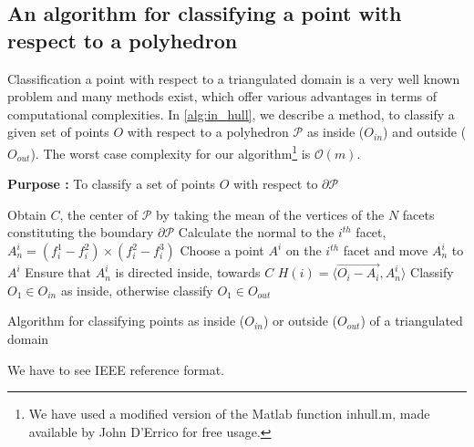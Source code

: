 \documentclass[12pt,a4]{article}
\begin{document}
\subsection{An algorithm for classifying a point with respect to a polyhedron}\label{app:polyhedron_point}
\indent Classification a point with respect to a triangulated domain is a very well known problem and many methods exist, which offer various advantages in terms of computational complexities. In \cref{alg:in_hull}, we describe a method, to classify a given set of points $O$ with respect to a polyhedron $\mathcal{P}$ as inside ($O_{in}$) and outside ($O_{out}$). The worst case complexity for our algorithm\footnote{We have used a modified version of the Matlab function inhull.m, made available by John D'Errico for free usage. } is $\mathcal{O}(m)$.    
\begin{algorithm}[ht!]
	\textbf{Purpose :} To classify a set of points $ O $ with respect to $\partial \mathcal{P}$\\
	\begin{algorithmic}[1]
		\STATE Obtain $C$, the center of $\mathcal{P}$ by taking the mean of the vertices of the $N$ facets constituting the boundary $\partial \mathcal{P}$
		\STATE Calculate the normal to the $i^{th}$ facet, $A_n^i=(f_i^1-f_i^2)\times(f_i^2-f_i^3)$
		\STATE Choose a point $A^i$ on the $i^{th}$ facet and move $A_n^i$ to $A^i$
		\STATE Ensure that $A_n^i$ is directed inside, towards $C$
		\STATE $H(i)=\langle\vec{O_i-A_i}, A_n^i\rangle$
		\ENDFOR 
		\STATE Classify $O_1 \in O_{in}$ as inside, otherwise classify $O_1\in O_{out}$  		
		\ENDIF
	\end{algorithmic}
	
	\caption{Algorithm for classifying points as inside ($O_{in}$) or outside ($O_{out}$) of a triangulated domain}		
	\label{alg:in_hull}
\end{algorithm}

%


\begin{thebibliography}{99}

We have to see IEEE reference format.
%
%


\end{thebibliography}
\end{document}
